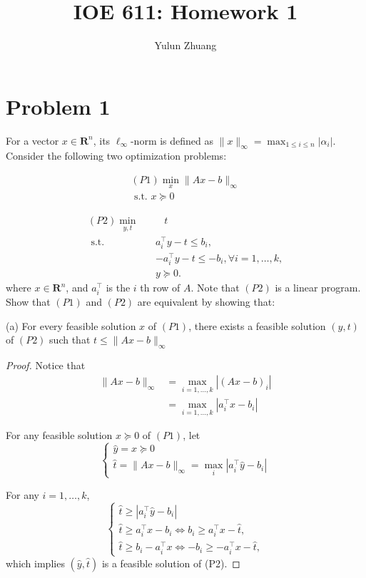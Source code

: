 \documentclass[11pt]{article}
\begin{document}
\title{IOE 611: Homework 1}
\author{Yulun Zhuang}
\maketitle
\section*{Problem 1}

For a vector $x \in \mathbf{R}^n$, its $\ell_{\infty}$-norm is defined as $\|x\|_{\infty}=\max _{1 \leq i \leq n}\left|\alpha_i\right|$. Consider the following two optimization problems:

$$
\begin{gathered}
(P 1) \min _x\|A x-b\|_{\infty} \\
\text { s.t. } x \succeq 0
\end{gathered}
$$


$$
\begin{aligned}
 { (P2) } \min _{y, t}~~~~&~~~~ t \\
\text { s.t. }~~~~ & a_i^{\top} y-t \leq b_i\text {, } \\
& -a_i^{\top} y-t \leq-b_i, \forall i=1, \ldots, k, \\
& y \succeq 0 \text {. }
\end{aligned}
$$
where $x \in \mathbf{R}^n$, and $a_i^{\top}$ is the $i$ th row of $A$. Note that $(P 2)$ is a linear program. Show that $(P 1)$ and $(P 2)$ are equivalent by showing that:

(a) For every feasible solution $x$ of $(P 1)$, there exists a feasible solution $(y, t)$ of $(P 2)$ such that $t \leq\|A x-b\|_{\infty}$

\begin{proof}
    Notice that
    $$
    \begin{aligned}
    \|A x-b\|_{\infty} & =\max _{i=1, \dots, k}\left|(A x-b)_i\right| \\
    & =\max _{i =1, \dots, k}\left|a_i^{\top} x-b_i\right|
    \end{aligned}
    $$

    For any feasible solution $x \succeq 0$ of $(P1)$, let
    $$
    \left\{\begin{array}{l}
    \hat y=x\succeq 0\\
    \hat t=\|A x-b\|_{\infty} =\max_{i}\left|a_i^{\top}\hat  y-b_i\right|
    \end{array}\right.
    $$
    
    For any $i=1, \dots, k$,
    $$
    \left\{\begin{array}{l}
    \hat t\geq \left|a_i^{\top} \hat y-b_i\right|\\
    \hat t \geq a_i^{\top} x-b_i \Leftrightarrow b_i \geq a_i^{\top} x-\hat t, \\
    \hat t \geq b_i-a_i^{\top} x \Leftrightarrow-b_i \geq-a_i^{\top} x-\hat t,
    \end{array}\right.
    $$    
    which implies $(\hat y, \hat t)$ is a feasible solution of (P2).
\end{proof}
\end{document}
